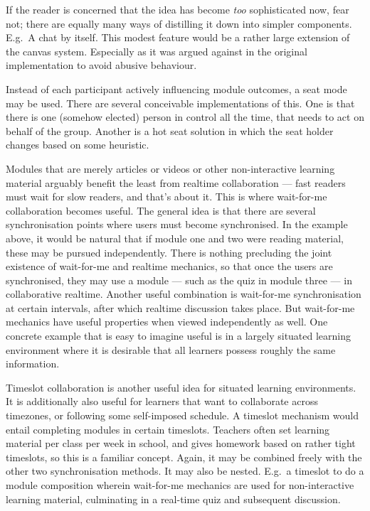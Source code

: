 \documentclass{article}
\begin{document}
\begin{multicols}{2}
If the reader is concerned that the idea has become \emph{too} sophisticated 
now, fear not; there are equally many ways of distilling it down into simpler 
components. E.g.\ A chat by itself. This modest feature would be a rather 
large extension of the canvas system. Especially as it was argued against in 
the original implementation to avoid abusive 
behaviour\cite{berntsen2015enabling}.

Instead of each participant actively influencing module outcomes, a seat mode 
may be used. There are several conceivable implementations of this. One is 
that there is one (somehow elected) person in control all the time, that needs 
to act on behalf of the group. Another is a hot seat solution in which the 
seat holder changes based on some heuristic.

Modules that are merely articles or videos or other non-interactive learning 
material arguably benefit the least from realtime collaboration --- fast 
readers must wait for slow readers, and that's about it. This is where 
wait-for-me collaboration becomes useful. The general idea is that there are 
several synchronisation points where users must become synchronised. In the 
example above, it would be natural that if module one and two were reading 
material, these may be pursued independently. There is nothing precluding the 
joint existence of wait-for-me and realtime mechanics, so that once the users 
are synchronised, they may use a module --- such as the quiz in module three 
--- in collaborative realtime. Another useful combination is wait-for-me 
synchronisation at certain intervals, after which realtime discussion takes 
place. But wait-for-me mechanics have useful properties when viewed 
independently as well. One concrete example that is easy to imagine useful is 
in a largely situated learning environment where it is desirable that all 
learners possess roughly the same information.

Timeslot collaboration is another useful idea for situated learning 
environments. It is additionally also useful for learners that want to 
collaborate across timezones, or following some self-imposed schedule. A 
timeslot mechanism would entail completing modules in certain timeslots. 
Teachers often set learning material per class per week in school, and gives 
homework based on rather tight timeslots, so this is a familiar concept. 
Again, it may be combined freely with the other two synchronisation methods. 
It may also be nested. E.g.\ a timeslot to do a module composition wherein 
wait-for-me mechanics are used for non-interactive learning material, 
culminating in a real-time quiz and subsequent discussion.


\end{multicols}
\end{document}
